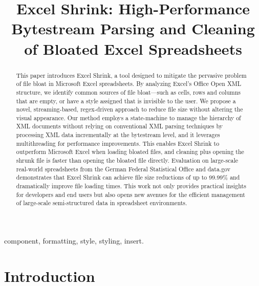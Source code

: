 \documentclass[conference]{IEEEtran}
\begin{document}
\title{Excel Shrink: High-Performance Bytestream Parsing and Cleaning of Bloated Excel Spreadsheets}


\author{

}

\maketitle

\begin{abstract}
  This paper introduces Excel Shrink, a tool designed to mitigate the pervasive problem of file bloat in Microsoft Excel spreadsheets. By analyzing Excel’s Office Open XML structure, we identify common sources of file bloat—such as cells, rows and columns that are empty, 
  or have a style assigned that is invisible to the user. We propose a novel, streaming-based, regex-driven approach to reduce file size without altering the visual appearance. Our method employs a state-machine to manage the hierarchy of XML documents without relying on conventional XML parsing techniques by processing XML data incrementally at the bytestream level, and it leverages multithreading for performance improvements. This enables Excel Shrink to outperform Microsoft Excel when loading bloated files, and cleaning plus opening the shrunk file is faster than opening the bloated file directly.
  Evaluation on large-scale real-world spreadsheets from the German Federal Statistical Office and data.gov demonstrates that Excel Shrink can achieve file size reductions of up to 99.99\% and dramatically improve file loading times.
  This work not only provides practical insights for developers and end users but also opens new avenues for the efficient management of large-scale semi-structured data in spreadsheet environments.

\end{abstract}

\begin{IEEEkeywords}
component, formatting, style, styling, insert.
\end{IEEEkeywords}

  
\section{Introduction}
\end{document}
